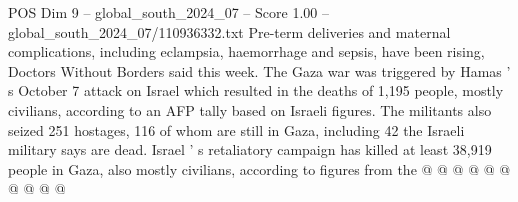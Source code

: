 \begin{textsample}{POS Dim 9 – global\_south\_2024\_07 – Score 1.00 – global\_south\_2024\_07/110936332.txt}
Pre-term deliveries and maternal complications, including eclampsia, haemorrhage and sepsis, have been rising, Doctors Without Borders said this week.
The Gaza war was triggered by Hamas ' s October 7 attack on Israel which resulted in the deaths of 1,195 people, mostly civilians, according to an AFP tally based on Israeli figures.
The militants also seized 251 hostages, 116 of whom are still in Gaza, including 42 the Israeli military says are dead.
Israel ' s retaliatory campaign has killed at least 38,919 people in Gaza, also mostly civilians, according to figures from the @ @ @ @ @ @ @ @ @ @

\end{textsample}
